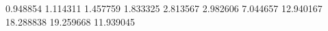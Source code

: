 0.948854
1.114311
1.457759
1.833325
2.813567
2.982606
7.044657
12.940167
18.288838
19.259668
11.939045

